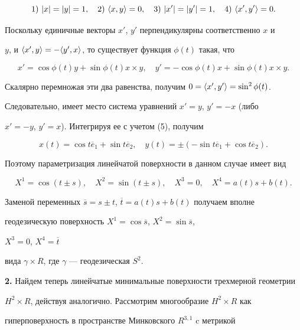 \begin{pf}
\begin{equation}
1)\ |x|=|y|=1,\quad 2)\ \la x,y\ra=0,\quad 3)\ |x'|=|y'|=1,\quad


4)\ \la x',y'\ra=0.


\end{equation}


Поскольку единичные векторы $x'$, $y'$ перпендикулярны соответственно $x$ и 


$y$, и $\langle x',y\rangle=-\langle y',x\rangle$, то существует функция $\phi (t)$ такая, что


$$


x'= \cos \phi (t)y+ \sin \phi (t)x \times y,\quad


y'=- \cos \phi (t)x+ \sin \phi (t) x \times y.


$$


Скалярно перемножая эти два равенства, получим $0=\langle x',y'\rangle= \sin ^2 \phi(t)$. 


Следовательно, имеет место система уравнений $x'=y$, $y'=-x$ (либо 


$x'=-y$, $y'=x$). Интегрируя ее с учетом (5), получим 


$$


x(t)= \cos t \overline e_1 + \sin t \overline e_2,\quad


y(t)= \pm(- \sin t \overline e_1+ \cos t \overline e_2).


$$


Поэтому параметризация линейчатой поверхности в данном случае имеет вид


$$


X^1= \cos(t \pm s),\quad X^2= \sin(t \pm s),\quad  X^3=0,\quad X^4=a(t)s+b(t).


$$


Заменой переменных $\overline s=s \pm t$, $\overline t=a(t)s+b(t)$ получаем вполне


геодезическую  поверхность $X^1=\cos \overline s$, $X^2= \sin \overline s$,


$X^3=0$, $X^4= \overline t$


вида $\gamma \times R$, где $ \gamma $ --- геодезическая $S^2$.


\end{pf}





{\bf 2.} Найдем теперь линейчатые минимальные поверхности трехмерной геометрии 


$H^2 \times R$, действуя аналогично. Рассмотрим многообразие $H^2 \times R$ как 


гиперповерхность в пространстве Минковского $R^{3,1}$ c метрикой 


